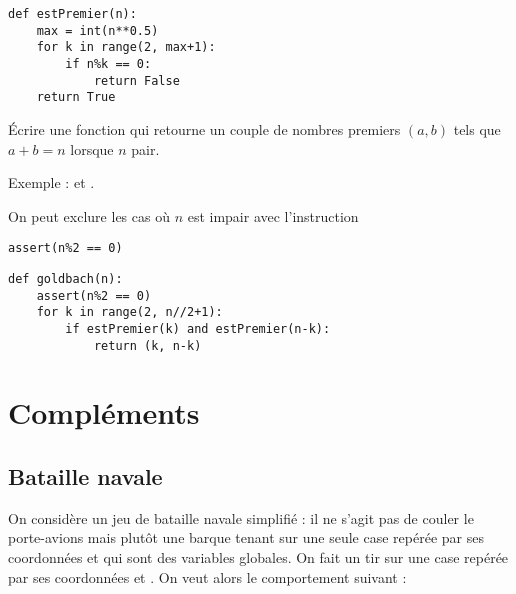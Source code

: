 \begin{Answer}
\begin{lstlisting}
def estPremier(n):
    max = int(n**0.5)
    for k in range(2, max+1):
        if n%k == 0:
            return False
    return True
\end{lstlisting}
\end{Answer}
\begin{Exercise}[title= Conjecture de Golbach]
Écrire une fonction  qui retourne un couple de nombres premiers $(a,b)$ tels que $a+b=n$ lorsque $n$ pair.

Exemple :  et .

On peut exclure les cas où $n$ est impair avec l'instruction
\begin{lstlisting}
assert(n%2 == 0)
\end{lstlisting}
\end{Exercise}
\begin{Answer}
\begin{lstlisting}
def goldbach(n):
    assert(n%2 == 0)
    for k in range(2, n//2+1):
        if estPremier(k) and estPremier(n-k):
            return (k, n-k)
\end{lstlisting}
\end{Answer}

\newpage
\section{Compléments}
\subsection{Bataille navale}
On considère un jeu de bataille navale simplifié : il ne s'agit pas de couler le porte-avions mais plutôt une barque tenant sur une seule case repérée par ses coordonnées  et  qui sont des variables globales. On fait un tir sur une case repérée par ses coordonnées  et . On veut alors le comportement suivant :

